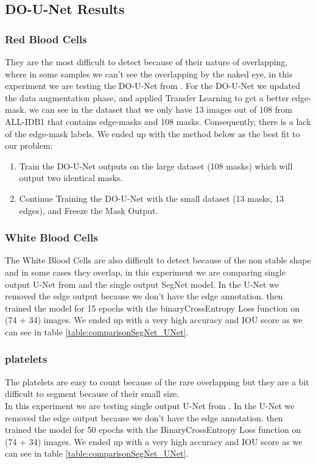 \documentclass[conference]{IEEEtran}
\begin{document}
\subsection{DO-U-Net Results}
\subsubsection{Red Blood Cells}
\hspace{\parindent}
They are the most difficult to detect because of their nature of overlapping, where in some samples we can't see the overlapping by the naked eye, in this experiment we are testing the DO-U-Net from \cite{10.1007/978-3-030-44584-3_31}.
For the DO-U-Net we updated the data augmentation phase, and applied Transfer Learning to get a better edge-mask. we can see in the dataset that we only have 13 images out of 108 from ALL-IDB1 that contains edge-masks and 108 masks. Consequently, there is a lack of the edge-mask labels.
We ended up with the method below as the best fit to our problem:

\begin{enumerate}
    \item Train the DO-U-Net outputs on the large dataset (108 masks) which will output two identical masks.
    \item Continue Training the DO-U-Net with the small dataset (13 masks, 13 edges), and Freeze the Mask Output.
\end{enumerate}

\subsubsection{White Blood Cells}
\hspace{\parindent}
The White Blood Cells are also difficult to detect because of the non stable shape and in some cases they overlap, in this experiment we are comparing single output U-Net from \cite{10.1007/978-3-030-44584-3_31} and the single output SegNet model.
In the U-Net we removed the edge output because we don't have the edge annotation. then trained the model for 15 epochs with the binaryCrossEntropy Loss function on (74 + 34) images. 
We ended up with a very high accuracy and IOU score as we can see in table \ref{table:comparisonSegNet_UNet}.

\subsubsection{platelets}
\hspace{\parindent}
The platelets are easy to count because of the rare overlapping but they are a bit difficult to segment because of their small size.\\
In this experiment we are testing single output U-Net from \cite{10.1007/978-3-030-44584-3_31}. In the U-Net we removed the edge output because we don’t have the edge annotation.
then trained the model for 50 epochs with the BinaryCrossEntropy Loss function on (74 + 34) images.
We ended up with a very high accuracy and IOU score as we can see in table \ref{table:comparisonSegNet_UNet}.
\end{document}
